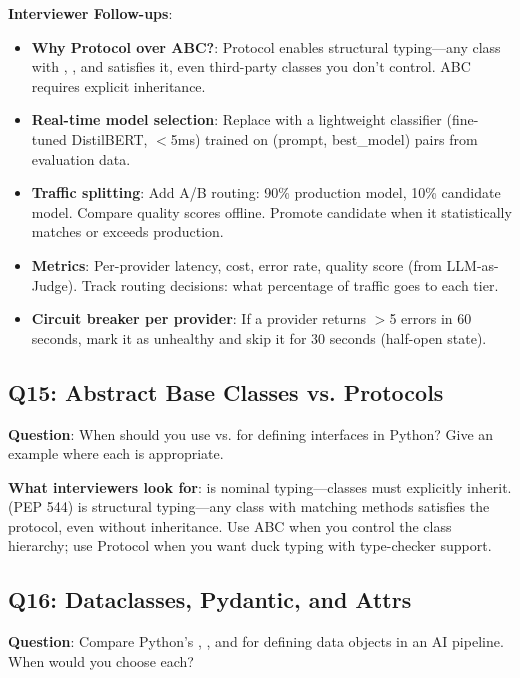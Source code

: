 \textbf{Interviewer Follow-ups}:
\begin{itemize}[leftmargin=*]
    \item \textbf{Why Protocol over ABC?}: Protocol enables structural typing---any class with , , and  satisfies it, even third-party classes you don't control. ABC requires explicit inheritance.
    \item \textbf{Real-time model selection}: Replace  with a lightweight classifier (fine-tuned DistilBERT, $<$5ms) trained on (prompt, best\_model) pairs from evaluation data.
    \item \textbf{Traffic splitting}: Add A/B routing: 90\% production model, 10\% candidate model. Compare quality scores offline. Promote candidate when it statistically matches or exceeds production.
    \item \textbf{Metrics}: Per-provider latency, cost, error rate, quality score (from LLM-as-Judge). Track routing decisions: what percentage of traffic goes to each tier.
    \item \textbf{Circuit breaker per provider}: If a provider returns $>$5 errors in 60 seconds, mark it as unhealthy and skip it for 30 seconds (half-open state).
\end{itemize}

\subsection{Q15: Abstract Base Classes vs. Protocols}

\textbf{Question}: When should you use  vs.  for defining interfaces in Python? Give an example where each is appropriate.

\textbf{What interviewers look for}:  is nominal typing---classes must explicitly inherit.  (PEP 544) is structural typing---any class with matching methods satisfies the protocol, even without inheritance. Use ABC when you control the class hierarchy; use Protocol when you want duck typing with type-checker support.

\subsection{Q16: Dataclasses, Pydantic, and Attrs}

\textbf{Question}: Compare Python's , , and  for defining data objects in an AI pipeline. When would you choose each?

